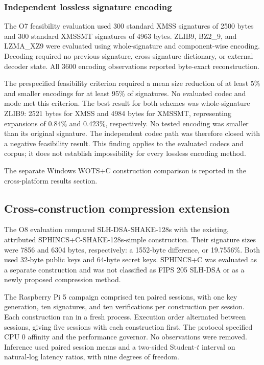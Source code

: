 \documentclass[pdflatex,sn-mathphys-num]{sn-jnl}
\begin{document}
\subsubsection{Independent lossless signature encoding}
The O7 feasibility evaluation used 300 standard XMSS signatures
of 2500 bytes and 300 standard XMSSMT signatures of 4963 bytes.
ZLIB9, BZ2\_9, and LZMA\_XZ9 were evaluated using whole-signature
and component-wise encoding. Decoding required no previous
signature, cross-signature dictionary, or external decoder state.
All 3600 encoding observations reported byte-exact reconstruction.

The prespecified feasibility criterion required a mean size
reduction of at least 5\% and smaller encodings for at least 95\%
of signatures. No evaluated codec and mode met this criterion.
The best result for both schemes was whole-signature ZLIB9:
2521 bytes for XMSS and 4984 bytes for XMSSMT, representing
expansions of 0.84\% and 0.423\%, respectively. No tested encoding
was smaller than its original signature. The independent codec
path was therefore closed with a negative feasibility result.
This finding applies to the evaluated codecs and corpus; it does
not establish impossibility for every lossless encoding method.

The separate Windows WOTS+C construction comparison is reported
in the cross-platform results section.

\subsection{Cross-construction compression extension}
\label{subsec:cross_construction}
The O8 evaluation compared SLH-DSA-SHAKE-128s with the existing,
attributed SPHINCS+C-SHAKE-128s-simple construction. Their
signature sizes were 7856 and 6304 bytes, respectively: a
1552-byte difference, or 19.7556\%. Both used 32-byte public
keys and 64-byte secret keys. SPHINCS+C was evaluated as a
separate construction and was not classified as FIPS 205
SLH-DSA or as a newly proposed compression method.

The Raspberry Pi 5 campaign comprised ten paired sessions,
with one key generation, ten signatures, and ten verifications
per construction per session. Each construction ran in a fresh
process. Execution order alternated between sessions, giving
five sessions with each construction first. The protocol
specified CPU 0 affinity and the performance governor.
No observations were removed. Inference used paired session
means and a two-sided Student-$t$ interval on natural-log
latency ratios, with nine degrees of freedom.
\end{document}
